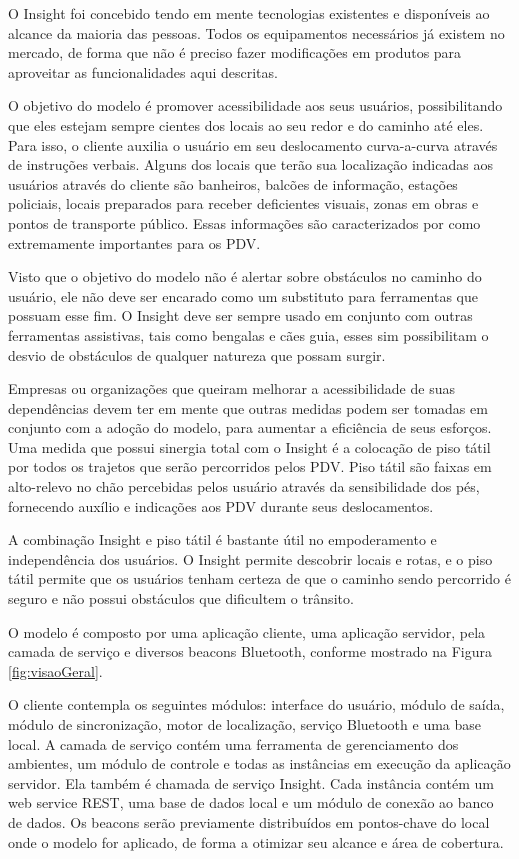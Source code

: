 \documentclass[english,brazilian]{UNISINOSmonografia}
\begin{document}
O Insight foi concebido tendo em mente tecnologias existentes e disponíveis ao alcance da maioria das pessoas. Todos os equipamentos necessários já existem no mercado, de forma que não é preciso fazer modificações em produtos para aproveitar as funcionalidades aqui descritas.

O objetivo do modelo é promover acessibilidade aos seus usuários, possibilitando que eles estejam sempre cientes dos locais ao seu redor e do caminho até eles. Para isso, o cliente auxilia o usuário em seu deslocamento curva-a-curva através de instruções verbais. Alguns dos locais que terão sua localização indicadas aos usuários através do cliente são banheiros, balcões de informação, estações policiais, locais preparados para receber deficientes visuais, zonas em obras e pontos de transporte público. Essas informações são caracterizados por  como extremamente importantes para os PDV.

Visto que o objetivo do modelo não é alertar sobre obstáculos no caminho do usuário, ele não deve ser encarado como um substituto para ferramentas que possuam esse fim. O Insight deve ser sempre usado em conjunto com outras ferramentas assistivas, tais como bengalas e cães guia, esses sim possibilitam o desvio de obstáculos de qualquer natureza que possam surgir. 

Empresas ou organizações que queiram melhorar a acessibilidade de suas dependências devem ter em mente que outras medidas podem ser tomadas em conjunto com a adoção do modelo, para aumentar a eficiência de seus esforços. Uma medida que possui sinergia total com o Insight é a colocação de piso tátil por todos os trajetos que serão percorridos pelos PDV. Piso tátil são faixas em alto-relevo no chão percebidas pelos usuário através da sensibilidade dos pés, fornecendo auxílio e indicações aos PDV durante seus deslocamentos.

A combinação Insight e piso tátil é bastante útil no empoderamento e independência dos usuários. O Insight permite descobrir locais e rotas, e o piso tátil permite que os usuários tenham certeza de que o caminho sendo percorrido é seguro e não possui obstáculos que dificultem o trânsito.

O modelo é composto por uma aplicação cliente, uma aplicação servidor, pela camada de serviço e diversos beacons Bluetooth, conforme mostrado na Figura \ref{fig:visaoGeral}. 

O cliente contempla os seguintes módulos: interface do usuário, módulo de saída, módulo de sincronização, motor de localização, serviço Bluetooth e uma base local. 
A camada de serviço contém uma ferramenta de gerenciamento dos ambientes, um módulo de controle e todas as instâncias em execução da aplicação servidor. Ela também é chamada de serviço Insight.
Cada instância contém um web service REST, uma base de dados local e um módulo de conexão ao banco de dados. 
Os beacons serão previamente distribuídos em pontos-chave do local onde o modelo for aplicado, de forma a otimizar seu alcance e área de cobertura.
\end{document}
